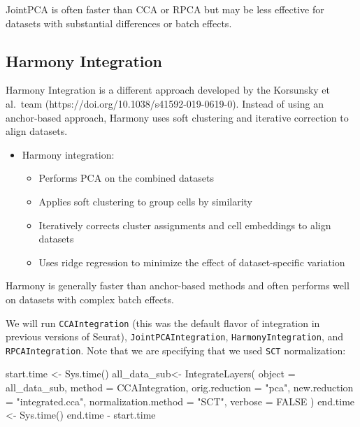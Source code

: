 \documentclass[
  letterpaper,
  DIV=11,
  numbers=noendperiod]{scrreprt}
\newenvironment{Shaded}{\begin{snugshade}}{\end{snugshade}}
\newcommand{\AttributeTok}[1]{\textcolor[rgb]{0.40,0.45,0.13}{#1}}
\newcommand{\ConstantTok}[1]{\textcolor[rgb]{0.56,0.35,0.01}{#1}}
\newcommand{\FunctionTok}[1]{\textcolor[rgb]{0.28,0.35,0.67}{#1}}
\newcommand{\NormalTok}[1]{\textcolor[rgb]{0.00,0.23,0.31}{#1}}
\newcommand{\OtherTok}[1]{\textcolor[rgb]{0.00,0.23,0.31}{#1}}
\newcommand{\SpecialCharTok}[1]{\textcolor[rgb]{0.37,0.37,0.37}{#1}}
\newcommand{\StringTok}[1]{\textcolor[rgb]{0.13,0.47,0.30}{#1}}
\providecommand{\tightlist}{%
  \setlength{\itemsep}{0pt}\setlength{\parskip}{0pt}}
\begin{document}
JointPCA is often faster than CCA or RPCA but may be less effective for
datasets with substantial differences or batch effects.

\subsection{Harmony Integration}\label{harmony-integration}

Harmony Integration is a different approach developed by the Korsunsky
et al.~team (https://doi.org/10.1038/s41592-019-0619-0). Instead of
using an anchor-based approach, Harmony uses soft clustering and
iterative correction to align datasets.

\begin{itemize}
\item
  Harmony integration:

  \begin{itemize}
  \tightlist
  \item
    Performs PCA on the combined datasets
  \item
    Applies soft clustering to group cells by similarity
  \item
    Iteratively corrects cluster assignments and cell embeddings to
    align datasets
  \item
    Uses ridge regression to minimize the effect of dataset-specific
    variation
  \end{itemize}
\end{itemize}

Harmony is generally faster than anchor-based methods and often performs
well on datasets with complex batch effects.

We will run \texttt{CCAIntegration} (this was the default flavor of
integration in previous versions of Seurat),
\texttt{JointPCAIntegration}, \texttt{HarmonyIntegration}, and
\texttt{RPCAIntegration}. Note that we are specifying that we used
\texttt{SCT} normalization:

\begin{Shaded}
\begin{Highlighting}[]
\NormalTok{start.time }\OtherTok{\textless{}{-}} \FunctionTok{Sys.time}\NormalTok{()}
\NormalTok{all\_data\_sub}\OtherTok{\textless{}{-}} \FunctionTok{IntegrateLayers}\NormalTok{(}
  \AttributeTok{object =}\NormalTok{ all\_data\_sub, }\AttributeTok{method =}\NormalTok{ CCAIntegration,}
  \AttributeTok{orig.reduction =} \StringTok{"pca"}\NormalTok{, }\AttributeTok{new.reduction =} \StringTok{"integrated.cca"}\NormalTok{, }\AttributeTok{normalization.method =} \StringTok{"SCT"}\NormalTok{,}
  \AttributeTok{verbose =} \ConstantTok{FALSE}
\NormalTok{)}
\NormalTok{end.time }\OtherTok{\textless{}{-}} \FunctionTok{Sys.time}\NormalTok{()}
\NormalTok{end.time }\SpecialCharTok{{-}}\NormalTok{ start.time}
\end{Highlighting}
\end{Shaded}
\end{document}
